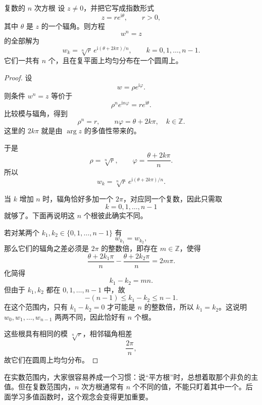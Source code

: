 \begin{dingli}{复数的 $n$ 次方根}{}
设 $z\neq 0$，并把它写成指数形式
\[
z=re^{\mathrm{i}\theta},\qquad r>0,
\]
其中 $\theta$ 是 $z$ 的一个辐角。则方程
\begin{equation}
    w^n=z
\end{equation}
的全部解为
\begin{equation}\label{eq:nth-roots}
    w_k=\sqrt[n]{r}\,e^{\mathrm{i}(\theta+2k\pi)/n},\qquad k=0,1,\dots,n-1.
\end{equation}
它们一共有 $n$ 个，且在复平面上均匀分布在一个圆周上。
\end{dingli}

\begin{proof}
设
\[
w=\rho e^{\mathrm{i}\varphi}.
\]
则条件 $w^n=z$ 等价于
\[
\rho^n e^{\mathrm{i}n\varphi}=re^{\mathrm{i}\theta}.
\]
比较模与辐角，得到
\begin{equation}
    \rho^n=r,\qquad n\varphi=\theta+2k\pi,\quad k\in\mathbb{Z}.
\end{equation}
这里的 $2k\pi$ 就是由 $\arg z$ 的多值性带来的。

于是
\[
\rho=\sqrt[n]{r},\qquad \varphi=\frac{\theta+2k\pi}{n}.
\]
所以
\[
w_k=\sqrt[n]{r}\,e^{\mathrm{i}(\theta+2k\pi)/n}.
\]

当 $k$ 增加 $n$ 时，辐角恰好多加一个 $2\pi$，对应同一个复数，因此只需取
\[
k=0,1,\dots,n-1
\]
就够了。下面再说明这 $n$ 个根彼此确实不同。

若对某两个 $k_1,k_2\in\{0,1,\dots,n-1\}$ 有
\[
w_{k_1}=w_{k_2},
\]
那么它们的辐角之差必须是 $2\pi$ 的整数倍，即存在 $m\in\mathbb{Z}$，使得
\[
\frac{\theta+2k_1\pi}{n}-\frac{\theta+2k_2\pi}{n}=2m\pi.
\]
化简得
\[
k_1-k_2=mn.
\]
但由于 $k_1,k_2$ 都在 $0,1,\dots,n-1$ 中，故
\[
-(n-1)\le k_1-k_2\le n-1.
\]
在这个范围内，只有 $k_1-k_2=0$ 才可能是 $n$ 的整数倍，所以 $k_1=k_2$。这说明 $w_0,w_1,\dots,w_{n-1}$ 两两不同，因此恰好有 $n$ 个根。

这些根具有相同的模 $\sqrt[n]{r}$，相邻辐角相差
\[
\frac{2\pi}{n},
\]
故它们在圆周上均匀分布。
\end{proof}

\begin{jinshi}[复数求方根为什么容易出错]
在实数范围内，大家很容易养成一个习惯：说``平方根''时，总想着取那个非负的主值。但在复数范围内，$n$ 次方根通常有 $n$ 个不同的值，不能只盯着其中一个。后面学习多值函数时，这个观念会变得更加重要。
\end{jinshi}

